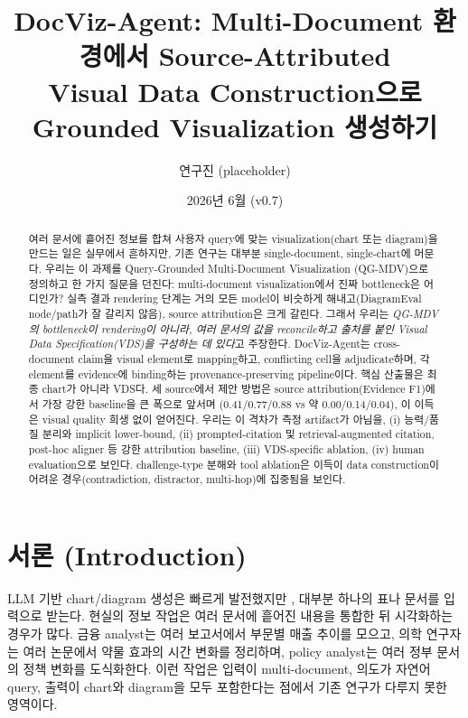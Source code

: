 \documentclass[11pt]{article}
\title{DocViz-Agent: Multi-Document 환경에서 Source-Attributed \\
       Visual Data Construction으로 Grounded Visualization 생성하기}
\author{연구진 (placeholder)}
\date{2026년 6월 (v0.7)}
\begin{document}
\maketitle

\begin{abstract}
여러 문서에 흩어진 정보를 합쳐 사용자 query에 맞는 visualization(chart 또는 diagram)을 만드는
일은 실무에서 흔하지만, 기존 연구는 대부분 single-document, single-chart에 머문다. 우리는 이
과제를 Query-Grounded Multi-Document Visualization (QG-MDV)으로 정의하고 한 가지 질문을 던진다:
multi-document visualization에서 진짜 bottleneck은 어디인가? 실측 결과 rendering 단계는 거의 모든
model이 비슷하게 해내고(DiagramEval node/path가 잘 갈리지 않음), source attribution은 크게 갈린다.
그래서 우리는 \emph{QG-MDV의 bottleneck이 rendering이 아니라, 여러 문서의 값을 reconcile하고 출처를
붙인 Visual Data Specification(VDS)을 구성하는 데 있다}고 주장한다. DocViz-Agent는 cross-document
claim을 visual element로 mapping하고, conflicting cell을 adjudicate하며, 각 element를 evidence에
binding하는 provenance-preserving pipeline이다. 핵심 산출물은 최종 chart가 아니라 VDS다. 세
source에서 제안 방법은 source attribution(Evidence F1)에서 가장 강한 baseline을 큰 폭으로 앞서며
(0.41/0.77/0.88 vs 약 0.00/0.14/0.04), 이 이득은 visual quality 희생 없이 얻어진다. 우리는 이
격차가 측정 artifact가 아님을, (i) 능력/품질 분리와 implicit lower-bound, (ii) prompted-citation
및 retrieval-augmented citation, post-hoc aligner 등 강한 attribution baseline, (iii) VDS-specific
ablation, (iv) human evaluation으로 보인다. challenge-type 분해와 tool ablation은 이득이 data
construction이 어려운 경우(contradiction, distractor, multi-hop)에 집중됨을 보인다.
\end{abstract}

\begin{center}
\end{center}

\section{서론 (Introduction)}

LLM 기반 chart/diagram 생성은 빠르게 발전했지만 \cite{han2023chartllama,yang2024chartmimic},
대부분 하나의 표나 문서를 입력으로 받는다. 현실의 정보 작업은 여러 문서에 흩어진 내용을 통합한 뒤
시각화하는 경우가 많다. 금융 analyst는 여러 보고서에서 부문별 매출 추이를 모으고, 의학 연구자는
여러 논문에서 약물 효과의 시간 변화를 정리하며, policy analyst는 여러 정부 문서의 정책 변화를
도식화한다. 이런 작업은 입력이 multi-document, 의도가 자연어 query, 출력이 chart와 diagram을 모두
포함한다는 점에서 기존 연구가 다루지 못한 영역이다.
\end{document}

